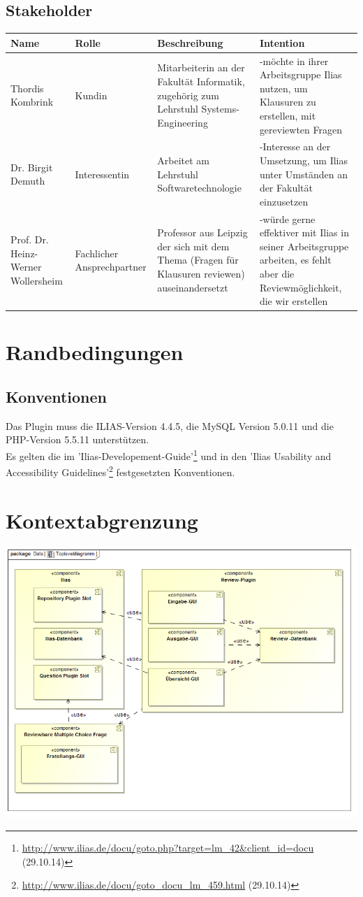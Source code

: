 \documentclass[a4paper]{scrreprt}
\begin{document}
\section{Stakeholder}
\begin{tabular}{|p{3.5cm}|p{2.3cm}|p{3cm}|p{4cm}|}\hline
Name & Rolle & Beschreibung & Intention \\\hline
Thordis Kombrink & Kundin & Mitarbeiterin an der Fakultät Informatik, zugehörig zum Lehrstuhl Systems-Engineering & -möchte in ihrer Arbeitsgruppe Ilias nutzen, um Klausuren zu erstellen, mit gereviewten Fragen\\\hline
Dr. Birgit Demuth & Interessentin & Arbeitet am Lehrstuhl Softwaretechnologie & -Interesse an der Umsetzung, um Ilias unter Umständen an der Fakultät einzusetzen\\\hline
Prof. Dr. Heinz-Werner Wollersheim & Fachlicher Ansprechpartner & Professor aus Leipzig der sich mit dem Thema (Fragen für Klausuren reviewen) auseinandersetzt & -würde gerne effektiver mit Ilias in seiner Arbeitsgruppe arbeiten, es fehlt aber die Reviewmöglichkeit, die wir erstellen\\\hline
\end{tabular}
\chapter{Randbedingungen}
\section{Konventionen} 
Das Plugin muss die ILIAS-Version 4.4.5, die MySQL Version 5.0.11 und die PHP-Version 5.5.11 unterstützen.\\
Es gelten die im 'Ilias-Developement-Guide'\footnote{\url{http://www.ilias.de/docu/goto.php?target=lm_42&client_id=docu} (29.10.14)} und in den 'Ilias Usability and Accessibility Guidelines'\footnote{\url{http://www.ilias.de/docu/goto_docu_lm_459.html} (29.10.14)} festgesetzten Konventionen.
\chapter{Kontextabgrenzung}

\includegraphics[width=1.0\textwidth]{Component_Diagram__Topleveldiagramm.png}
\label{Toplevel-Architektur}
\end{document}
